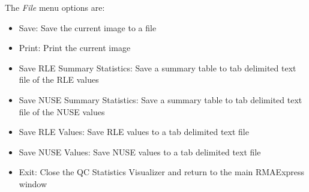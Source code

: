 \documentclass[11pt]{report}
\begin{document}
The {\it File} menu options are:
\begin{itemize}
\item{Save}: Save the current image to a file
\item{Print}: Print the current image
\item{Save RLE Summary Statistics}: Save a summary table to tab delimited text file of the RLE values
\item{Save NUSE Summary Statistics}: Save a summary table to tab delimited text file of the NUSE values
\item{Save RLE Values}: Save RLE values to a tab delimited text file
\item{Save NUSE Values}: Save NUSE values to a tab delimited text file
\item{Exit}: Close the QC Statistics Visualizer and return to the main RMAExpress window
\end{itemize}
\end{document}
